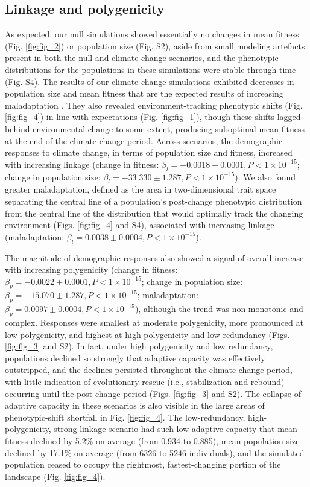 \documentclass[9pt,twocolumn,twoside,lineno]{new_article}
\begin{document}
\subsection*{Linkage and polygenicity}
As expected, our null simulations showed essentially no changes
in mean fitness (Fig. \ref{fig:fig_2}) or population size (Fig. S2), aside from small modeling artefacts present in both the 
null and climate-change scenarios, and the phenotypic distributions for the populations in these simulations were
stable through time (Fig. S4).
The results of our climate change simulations exhibited
decreases in population size and mean fitness
that are the expected results of increasing maladaptation \cite{aitken_whitlock}.
They also revealed environment-tracking phenotypic shifts (Fig. \ref{fig:fig_4})
in line with expectations (Fig. \ref{fig:fig_1}),
though these shifts lagged behind environmental change to some extent,
producing suboptimal mean fitness at the end of the climate change period.
Across scenarios, the demographic responses to
climate change, in terms of population size and fitness, increased with increasing linkage
(change in fitness: $\beta_{l} = -0.0018\pm0.0001, P<1\times10^{-15}$;
change in population size: $\beta_{l} = -33.330\pm1.287, P<1\times10^{-15}$).
We also found greater maladaptation, defined as the area in two-dimensional trait space separating the central line
of a population's post-change phenotypic distribution from the central line of the distribution
that would optimally track the changing environment (Figs. \ref{fig:fig_4} and S4), associated with increasing linkage (maladaptation: $\beta_{l} = 0.0038\pm0.0004, P<1\times10^{-15}$).

The magnitude of demographic responses also showed a signal of overall increase with increasing polygenicity
(change in fitness: $\beta_{p} = -0.0022\pm0.0001, P<1\times10^{-15}$;
change in population size: $\beta_{p} = -15.070\pm1.287, P<1\times10^{-15}$;
maladaptation: $\beta_{p} = 0.0097\pm0.0004, P<1\times10^{-15}$),
although the trend was non-monotonic and complex. Responses were smallest at moderate polygenicity,
more pronounced at low polygenicity,
and highest at high polygenicity and low redundancy (Figs. \ref{fig:fig_3} and S2).
In fact, under high polygenicity and low redundancy,
populations declined so strongly that adaptive capacity was effectively outstripped,
and the declines persisted throughout
the climate change period, with little indication of evolutionary rescue
(i.e., stabilization and rebound) occurring until the post-change period (Figs. \ref{fig:fig_3} and S2).
The collapse of adaptive capacity in these scenarios
is also visible in the large areas of phenotypic-shift shortfall in Fig. \ref{fig:fig_4}.
The low-redundancy, high-polygenicity, strong-linkage scenario had such low adaptive capacity
that mean fitness declined by 5.2\% on average (from 0.934 to 0.885),
mean population size declined by 17.1\% on average (from 6326 to 5246 individuals),
and the simulated population ceased to occupy the rightmost, fastest-changing portion of the landscape (Fig. \ref{fig:fig_4}).
\end{document}
